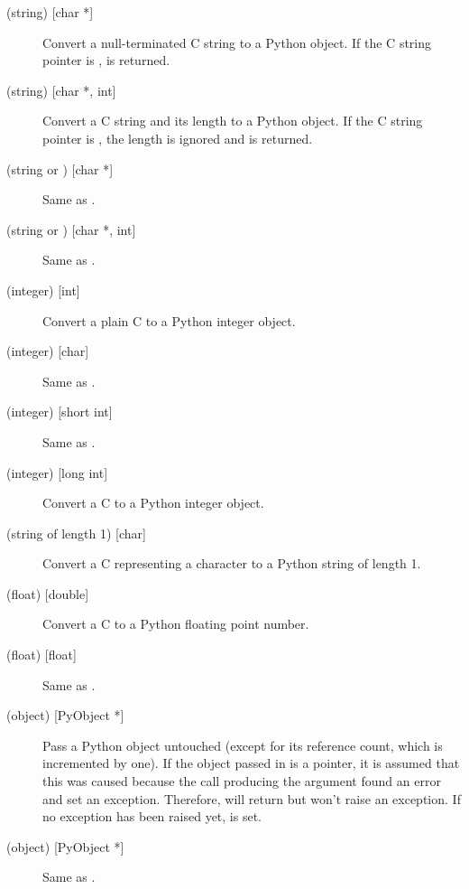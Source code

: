 \documentclass{manual}
\begin{document}
\begin{description}

\item[ (string) {[char *]}]
Convert a null-terminated C string to a Python object.  If the C
string pointer is \NULL{},  is returned.

\item[ (string) {[char *, int]}]
Convert a C string and its length to a Python object.  If the C string
pointer is \NULL{}, the length is ignored and  is
returned.

\item[ (string or ) {[char *]}]
Same as .

\item[ (string or ) {[char *, int]}]
Same as .

\item[ (integer) {[int]}]
Convert a plain C  to a Python integer object.

\item[ (integer) {[char]}]
Same as .

\item[ (integer) {[short int]}]
Same as .

\item[ (integer) {[long int]}]
Convert a C  to a Python integer object.

\item[ (string of length 1) {[char]}]
Convert a C  representing a character to a Python string of
length 1.

\item[ (float) {[double]}]
Convert a C  to a Python floating point number.

\item[ (float) {[float]}]
Same as .

\item[ (object) {[PyObject *]}]
Pass a Python object untouched (except for its reference count, which
is incremented by one).  If the object passed in is a \NULL{}
pointer, it is assumed that this was caused because the call producing
the argument found an error and set an exception.  Therefore,
 will return \NULL{} but won't raise an
exception.  If no exception has been raised yet,
 is set.

\item[ (object) {[PyObject *]}]
Same as .


\end{description}
\end{document}
